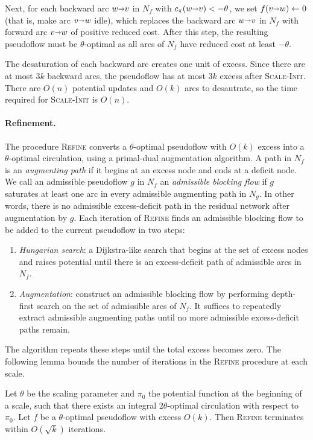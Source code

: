 \documentclass[11pt]{article}
\def\arcto{\mathord\shortrightarrow}
\def\arc#1#2{#1\arcto#2}
\theoremstyle{plain}
\numberwithin{figure}{section}
\def\EMPH#1{\textcolor{BrickRed}{{\emph{#1}}}}
\begin{document}
Next, for each backward arc $\arc wv$ in $N_f$ with $c_\pi(\arc wv) < -\theta$,
we set $f(\arc vw) \gets 0$ (that is, make arc $\arc vw$ idle), which replaces the
backward arc $\arc wv$ in $N_f$ with forward arc $\arc vw$ of positive reduced cost.
After this step, the resulting pseudoflow must be $\theta$-optimal as all arcs
of $N_f$ have reduced cost at least $-\theta$.

The desaturation of each backward arc creates one unit of excess.
Since there are at most $3k$ backward arcs, the pseudoflow has at most $3k$ excess after
\textsc{Scale-Init}.
There are $O(n)$ potential updates and $O(k)$ arcs to desautrate,
so the time required for \textsc{Scale-Init} is $O(n)$.

\paragraph*{Refinement.}
The procedure \textsc{Refine} converts a $\theta$-optimal pseudoflow with
$O(k)$ excess into a $\theta$-optimal circulation, using a primal-dual
augmentation algorithm.
A path in $N_f$ is an \EMPH{augmenting path} if it begins at an excess node
and ends at a deficit node.
We call an admissible pseudoflow $g$ in $N_f$ an
\EMPH{admissible blocking flow} if $g$ saturates at least one arc in every
admissible augmenting path in $N_g$.
In other words, there is no admissible excess-deficit path in the residual
network after augmentation by $g$.
Each iteration of \textsc{Refine} finds an admissible blocking flow to be added
to the current pseudoflow in two steps:
\begin{enumerate}
\item
\EMPH{Hungarian search}: a Dijkstra-like search that begins at the set of
excess nodes and raises potential until there is an excess-deficit path
of admissible arcs in $N_f$.
\item
\EMPH{Augmentation}: construct an admissible blocking flow by performing
depth-first search on the set of admissible arcs of $N_f$.
It suffices to repeatedly extract admissible augmenting paths until no more
admissible excess-deficit paths remain.
\end{enumerate}
The algorithm repeats these steps until the total excess becomes zero.
The following lemma bounds the number of iterations in the \textsc{Refine}
procedure at each scale.

\begin{lemma}
\label{lemma:refine_iters}
Let $\theta$ be the scaling parameter and $\pi_0$ the potential function at the
beginning of a scale, such that there exists an integral $2\theta$-optimal
circulation with respect to $\pi_0$.
Let $f$ be a $\theta$-optimal pseudoflow with excess $O(k)$.
Then \textsc{Refine} terminates within $O(\sqrt{k})$ iterations.
\end{lemma}
\end{document}
